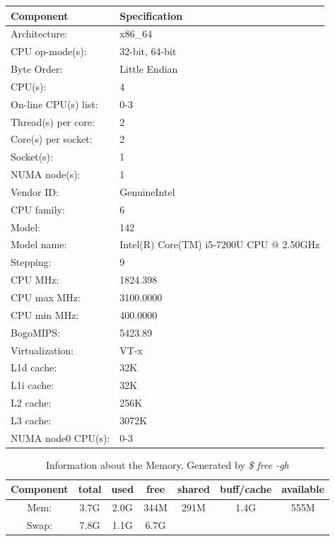 \documentclass[usletter, 12pt]{article}
\begin{document}
\begin{table}[h]
\begin{tabular*}{300pt}{@{\extracolsep{\fill}} p{5cm} p{5cm}}
            \textbf{Component} & \textbf{Specification} \\
            \hline
            Architecture:          & x86\_64 \\
            CPU op-mode(s):        & 32-bit, 64-bit \\
            Byte Order:            & Little Endian \\
            CPU(s):                & 4 \\
            On-line CPU(s) list:   & 0-3 \\
            Thread(s) per core:    & 2 \\
            Core(s) per socket:    & 2 \\
            Socket(s):             & 1 \\
            NUMA node(s):          & 1 \\
            Vendor ID:             & GenuineIntel \\
            CPU family:            & 6 \\
            Model:                 & 142 \\
            Model name:            & Intel(R) Core(TM) i5-7200U CPU @ 2.50GHz \\
            Stepping:              & 9 \\
            CPU MHz:               & 1824.398 \\
            CPU max MHz:           & 3100.0000 \\
            CPU min MHz:           & 400.0000 \\
            BogoMIPS:              & 5423.89 \\
            Virtualization:        & VT-x \\
            L1d cache:             & 32K \\
            L1i cache:             & 32K \\
            L2 cache:              & 256K \\
            L3 cache:              & 3072K \\
            NUMA node0 CPU(s):     & 0-3 \\
            \end{tabular*}
        \end{table}

        \begin{table}[h]
            \caption{Information about the Memory, Generated by \textit{\$ free -gh}}
            \centering
            \begin{tabular*}{400pt}{@{\extracolsep{\fill}} ccccccc}

            \textbf{Component} & \textbf{total} & \textbf{used} & \textbf{free} & \textbf{shared} & \textbf{buff/cache} & \textbf{available} \\
            \hline
            Mem: & 3.7G & 2.0G & 344M & 291M & 1.4G & 555M \\
            Swap: & 7.8G & 1.1G & 6.7G & & & \\
            \end{tabular*}
        \end{table}
\end{document}
